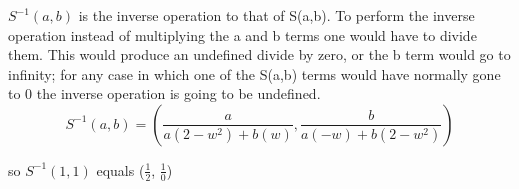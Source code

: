 \documentclass[12pt]{article}
\begin{document}
\newpage
$S^{-1}(a,b)$ is the inverse operation to that of S(a,b). To perform the inverse operation instead of multiplying the a and b terms one would have to divide them. This would produce an undefined divide by zero, or the b term would go to infinity; for any case in which one of the S(a,b) terms would have normally gone to 0 the inverse operation is going to be undefined.  
$$ S^{-1}(a,b) = ( \frac{a}{ a(2-w^{2}) + b(w)} , \frac{b}{a(-w) + b(2-w^{2})} ) $$

so $S^{-1}(1,1)$ equals ($\frac{1}{2}$, $\frac{1}{0}$)
\end{document}
